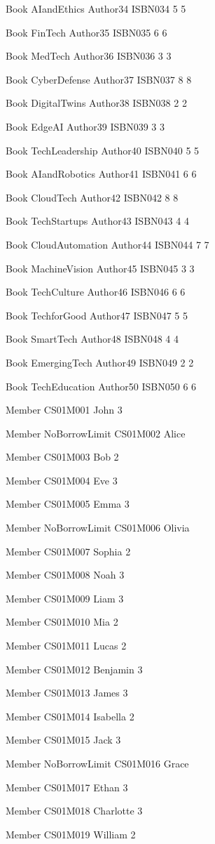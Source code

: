 Book
AIandEthics Author34 ISBN034 5 5

Book
FinTech Author35 ISBN035 6 6

Book
MedTech Author36 ISBN036 3 3

Book
CyberDefense Author37 ISBN037 8 8

Book
DigitalTwins Author38 ISBN038 2 2

Book
EdgeAI Author39 ISBN039 3 3

Book
TechLeadership Author40 ISBN040 5 5

Book
AIandRobotics Author41 ISBN041 6 6

Book
CloudTech Author42 ISBN042 8 8

Book
TechStartups Author43 ISBN043 4 4

Book
CloudAutomation Author44 ISBN044 7 7

Book
MachineVision Author45 ISBN045 3 3

Book
TechCulture Author46 ISBN046 6 6

Book
TechforGood Author47 ISBN047 5 5

Book
SmartTech Author48 ISBN048 4 4

Book
EmergingTech Author49 ISBN049 2 2

Book
TechEducation Author50 ISBN050 6 6

Member
CS01M001 John 3

Member
NoBorrowLimit CS01M002 Alice

Member
CS01M003 Bob 2

Member
CS01M004 Eve 3

Member
CS01M005 Emma 3

Member
NoBorrowLimit CS01M006 Olivia

Member
CS01M007 Sophia 2

Member
CS01M008 Noah 3

Member
CS01M009 Liam 3

Member
CS01M010 Mia 2

Member
CS01M011 Lucas 2

Member
CS01M012 Benjamin 3

Member
CS01M013 James 3

Member
CS01M014 Isabella 2

Member
CS01M015 Jack 3

Member
NoBorrowLimit CS01M016 Grace

Member
CS01M017 Ethan 3

Member
CS01M018 Charlotte 3

Member
CS01M019 William 2

